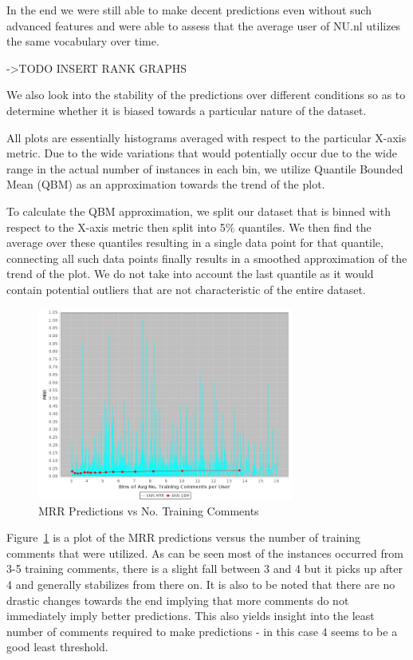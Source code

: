 In the end we were still able to make decent predictions even without such advanced features and were able to assess that the average user of NU.nl utilizes the same vocabulary over time.

->TODO INSERT RANK GRAPHS

We also look into the stability of the predictions over different conditions so as to determine whether it is biased towards a particular nature of the dataset.

All plots are essentially histograms averaged with respect to the particular X-axis metric. Due to the wide variations that would potentially occur due to the wide range in the actual number of instances in each bin, we utilize Quantile Bounded Mean (QBM) as an approximation towards the trend of the plot.

To calculate the QBM approximation, we split our dataset that is binned with respect to the X-axis metric then split into 5\% quantiles. We then find the average over these quantiles resulting in a single data point for that quantile, connecting all such data points finally results in a smoothed approximation of the trend of the plot. We do not take into account the last quantile as it would contain potential outliers that are not characteristic of the entire dataset.

\begin{figure}[!h]
\centering
\includegraphics[width=0.75\textwidth]{c-inv_images/AuthorshipUserCountMRR.jpeg}
\caption{MRR Predictions vs No. Training Comments}
\label{fig:AuthorshipUserCountMRR}
\end{figure}

Figure~\ref{fig:AuthorshipUserCountMRR} is a plot of the MRR predictions versus the number of training comments that were utilized. As can be seen most of the instances occurred from 3-5 training comments, there is a slight fall between 3 and 4 but it picks up after 4 and generally stabilizes from there on. It is also to be noted that there are no drastic changes towards the end implying that more comments do not immediately imply better predictions. This also yields insight into the least number of comments required to make predictions - in this case 4 seems to be a good least threshold.

